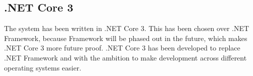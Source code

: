 \subsection{.NET Core 3} \label{ssc:tech_core}
The system has been written in .NET Core 3. This has been chosen over .NET Framework, because Framework will be phased out in the future, which makes .NET Core 3 more future proof. .NET Core 3 has been developed to replace .NET Framework and with the ambition to make development across different operating systems easier.